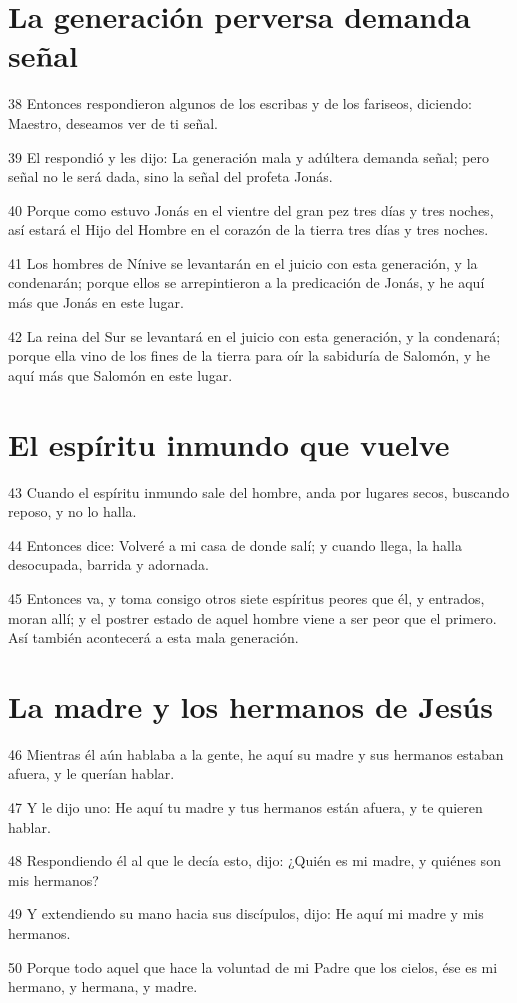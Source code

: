 \section*{La generación perversa demanda señal}

\par 38 Entonces respondieron algunos de los escribas y de los fariseos, diciendo: Maestro, deseamos ver de ti señal.
\par 39 El respondió y les dijo: La generación mala y adúltera demanda señal; pero señal no le será dada, sino la señal del profeta Jonás.
\par 40 Porque como estuvo Jonás en el vientre del gran pez tres días y tres noches, así estará el Hijo del Hombre en el corazón de la tierra tres días y tres noches.
\par 41 Los hombres de Nínive se levantarán en el juicio con esta generación, y la condenarán; porque ellos se arrepintieron a la predicación de Jonás, y he aquí más que Jonás en este lugar.
\par 42 La reina del Sur se levantará en el juicio con esta generación, y la condenará; porque ella vino de los fines de la tierra para oír la sabiduría de Salomón, y he aquí más que Salomón en este lugar.

\section*{El espíritu inmundo que vuelve}

\par 43 Cuando el espíritu inmundo sale del hombre, anda por lugares secos, buscando reposo, y no lo halla.
\par 44 Entonces dice: Volveré a mi casa de donde salí; y cuando llega, la halla desocupada, barrida y adornada.
\par 45 Entonces va, y toma consigo otros siete espíritus peores que él, y entrados, moran allí; y el postrer estado de aquel hombre viene a ser peor que el primero. Así también acontecerá a esta mala generación.

\section*{La madre y los hermanos de Jesús}

\par 46 Mientras él aún hablaba a la gente, he aquí su madre y sus hermanos estaban afuera, y le querían hablar.
\par 47 Y le dijo uno: He aquí tu madre y tus hermanos están afuera, y te quieren hablar.
\par 48 Respondiendo él al que le decía esto, dijo: ¿Quién es mi madre, y quiénes son mis hermanos?
\par 49 Y extendiendo su mano hacia sus discípulos, dijo: He aquí mi madre y mis hermanos.
\par 50 Porque todo aquel que hace la voluntad de mi Padre que los cielos, ése es mi hermano, y hermana, y madre.

